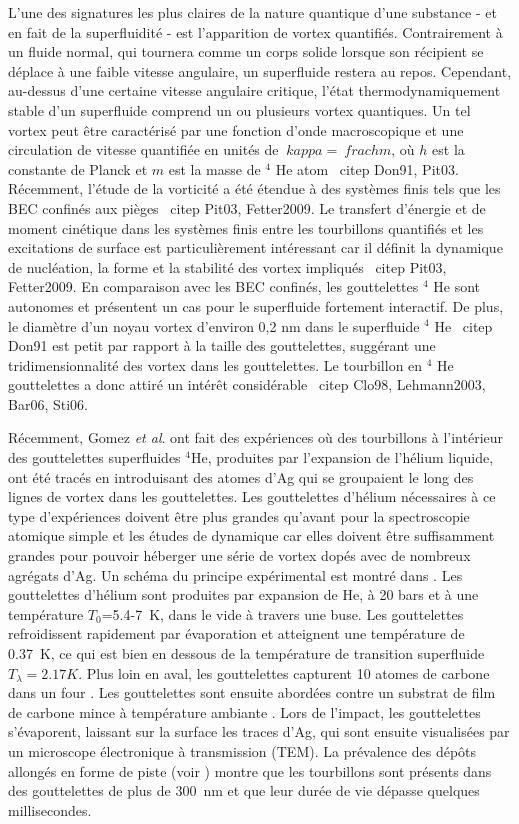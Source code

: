 		L'une des signatures les plus claires de la nature quantique d'une substance - et en fait de la superfluidité - est l'apparition de vortex quantifiés. Contrairement à un fluide normal, qui tournera comme un corps solide lorsque son récipient se déplace à une faible vitesse angulaire, un superfluide restera au repos. Cependant, au-dessus d'une certaine vitesse angulaire critique, l'état thermodynamiquement stable d'un superfluide comprend un ou plusieurs vortex quantiques. Un tel vortex peut être caractérisé par une fonction d'onde macroscopique et une circulation de vitesse quantifiée en unités de $ \ kappa = \ frac {h} {m} $, où $ h $ est la constante de Planck et $ m $ est la masse de $ ^ 4 $ He atom \ citep {Don91, Pit03}. Récemment, l'étude de la vorticité a été étendue à des systèmes finis tels que les BEC confinés aux pièges \ citep {Pit03, Fetter2009}. Le transfert d'énergie et de moment cinétique dans les systèmes finis entre les tourbillons quantifiés et les excitations de surface est particulièrement intéressant car il définit la dynamique de nucléation, la forme et la stabilité des vortex impliqués \ citep {Pit03, Fetter2009}. En comparaison avec les BEC confinés, les gouttelettes $ ^ 4 $ He sont autonomes et présentent un cas pour le superfluide fortement interactif. De plus, le diamètre d'un noyau vortex d'environ 0,2 nm dans le superfluide $ ^ 4 $ He \ citep {Don91} est petit par rapport à la taille des gouttelettes, suggérant une tridimensionnalité des vortex dans les gouttelettes. Le tourbillon en $ ^ 4 $ He gouttelettes a donc attiré un intérêt considérable \ citep {Clo98, Lehmann2003, Bar06, Sti06}.
		
		Récemment, Gomez \emph{et al}. ont fait des expériences\citep{Gom12} où des tourbillons à l'intérieur des gouttelettes superfluides $^4$He, produites par l'expansion de l'hélium liquide, ont été tracés en introduisant des atomes d'Ag qui se groupaient le long des lignes de vortex dans les gouttelettes. Les gouttelettes d'hélium nécessaires à ce type d'expériences doivent être plus grandes qu'avant pour la spectroscopie atomique simple et les études de dynamique car elles doivent être suffisamment grandes pour pouvoir héberger une série de vortex dopés avec de nombreux agrégats d'Ag. Un schéma du principe expérimental est montré dans . Les gouttelettes d'hélium sont produites par expansion de He, à 20 bars et à une température $T_0$=5.4-7~K, dans le vide à travers une buse. Les gouttelettes refroidissent rapidement par évaporation et atteignent une température de 0.37~K\citep{Hartmann1995}, ce qui est bien en dessous de la température de transition superfluide $T_\lambda=2.17\unit{K}$\citep{Don91,Pit03}. Plus loin en aval, les gouttelettes capturent 10 atomes de carbone dans un four \citep{Log11d}. Les gouttelettes sont ensuite abordées contre un substrat de film de carbone mince à température ambiante \citep{Log11d}. Lors de l'impact, les gouttelettes s'évaporent, laissant sur la surface les traces d'Ag, qui sont ensuite visualisées par un microscope électronique à transmission (TEM). La prévalence des dépôts allongés en forme de piste (voir ) montre que les tourbillons sont présents dans des gouttelettes de plus de 300~nm et que leur durée de vie dépasse quelques millisecondes.
		
